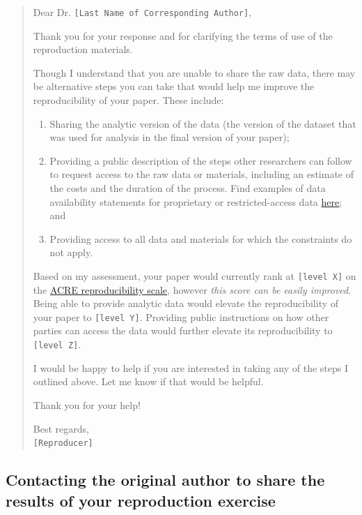 \documentclass[]{book}
\providecommand{\tightlist}{%
  \setlength{\itemsep}{0pt}\setlength{\parskip}{0pt}}
\begin{document}
\begin{quote}
Dear Dr. \texttt{{[}Last\ Name\ of\ Corresponding\ Author{]}},

Thank you for your response and for clarifying the terms of use of the reproduction materials.

Though I understand that you are unable to share the raw data, there may be alternative steps you can take that would help me improve the reproducibility of your paper. These include:

\begin{enumerate}
\def\labelenumi{\arabic{enumi}.}
\tightlist
\item
  Sharing the analytic version of the data (the version of the dataset that was used for analysis in the final version of your paper);\\
\item
  Providing a public description of the steps other researchers can follow to request access to the raw data or materials, including an estimate of the costs and the duration of the process. Find examples of data availability statements for proprietary or restricted-access data \href{https://social-science-data-editors.github.io/guidance/Requested_information_dcas.html}{here}; and\\
\item
  Providing access to all data and materials for which the constraints do not apply.
\end{enumerate}

Based on my assessment, your paper would currently rank at \texttt{{[}level\ X{]}} on the \href{https://bitss.github.io/ACRE/assessment.html\#levels-of-computational-reproducibility-for-a-specific-output}{ACRE reproducibility scale}, however \emph{this score can be easily improved}. Being able to provide analytic data would elevate the reproducibility of your paper to \texttt{{[}level\ Y{]}}. Providing public instructions on how other parties can access the data would further elevate its reproducibility to \texttt{{[}level\ Z{]}}.

I would be happy to help if you are interested in taking any of the steps I outlined above. Let me know if that would be helpful.

Thank you for your help!

Best regards,\\
\texttt{{[}Reproducer{]}}
\end{quote}

\hypertarget{contacting-the-original-author-to-share-the-results-of-your-reproduction-exercise}{%
\subsection{Contacting the original author to share the results of your reproduction exercise}\label{contacting-the-original-author-to-share-the-results-of-your-reproduction-exercise}}
\end{document}
